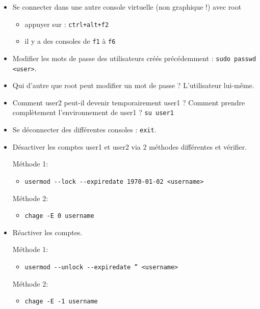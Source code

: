 \documentclass[a4paper]{article}
\begin{document}
\begin{itemize}
\item Se connecter dans une autre console virtuelle (non graphique !) avec root
\begin{example}
    \begin{itemize}
        \item appuyer sur : \texttt{ctrl+alt+f2}
        \item il y a des consoles de \texttt{f1} à \texttt{f6}
    \end{itemize}
\end{example}

\item Modifier les mots de passe des utilisateurs créés précédemment : \texttt{sudo passwd <user>}.

\item Qui d'autre que root peut modifier un mot de passe ? L'utilisateur lui-même.

\item Comment user2 peut-il devenir temporairement user1 ? Comment prendre complètement l'environnement de user1 ? \texttt{su user1}

\item Se déconnecter des différentes consoles : \texttt{exit}.

\item Désactiver les comptes user1 et user2 via 2 méthodes différentes et vérifier.
\begin{example}
    Méthode 1:
    \begin{itemize}
        \item \texttt{usermod -{}-lock -{}-expiredate 1970-01-02 <username>}
    \end{itemize}
    Méthode 2:
    \begin{itemize}
        \item \texttt{chage -E 0 username}
    \end{itemize}
\end{example}

\item Réactiver les comptes.
\begin{example}
    Méthode 1:
    \begin{itemize}
        \item \texttt{usermod -{}-unlock -{}-expiredate '' <username>}
    \end{itemize}
    Méthode 2:
    \begin{itemize}
        \item \texttt{chage -E -1 username}
    \end{itemize}
\end{example}


\end{itemize}
\end{document}
